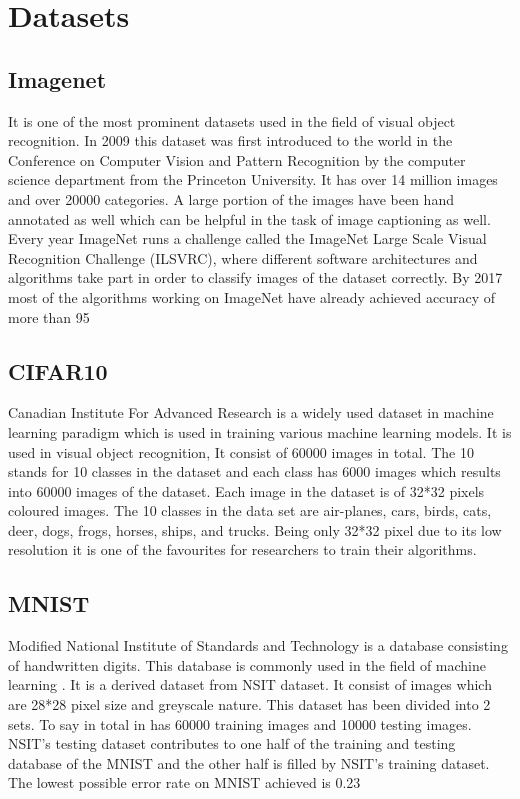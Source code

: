 \documentclass[titlepage]{report}
\begin{document}
\section{Datasets}

\subsection{Imagenet}
It is one of the most prominent datasets used in the field of visual object recognition. In 2009 this dataset was first introduced to the world in the Conference on Computer Vision and Pattern Recognition by the computer science department from the Princeton University. It has over 14 million images and over 20000 categories. A large portion of the images have been hand annotated as well which can be helpful in the task of image captioning as well. Every year ImageNet runs a challenge called the ImageNet Large Scale Visual Recognition Challenge (ILSVRC), where different software architectures and algorithms take part in order to classify images of the dataset correctly. By 2017 most of the algorithms working on ImageNet have already achieved accuracy of more than 95%

\subsection{CIFAR10}
Canadian Institute For Advanced Research is a widely used dataset in machine learning paradigm which is used in training various machine learning models. It is used in visual object recognition, It consist of 60000 images in total. The 10 stands for 10 classes in the dataset and each class has 6000 images which results into 60000 images of the dataset. Each image in the dataset is of 32*32 pixels coloured images. The 10 classes in the data set are air-planes, cars, birds, cats, deer, dogs, frogs, horses, ships, and trucks. Being only 32*32 pixel due to its low resolution it is one of the favourites for researchers to train their algorithms. 

\subsection{MNIST}
Modified National Institute of Standards and Technology is a database consisting of handwritten digits. This database is commonly used in the field of machine learning . It is a derived dataset from NSIT dataset. It consist of images which are 28*28 pixel size and greyscale nature. This dataset has been divided into 2 sets. To say in total in has 60000 training images and 10000 testing images. NSIT’s testing dataset contributes to one half of the training and testing database of the MNIST and the other half is filled by NSIT’s training dataset. The lowest possible error rate on MNIST achieved is 0.23%
\end{document}
